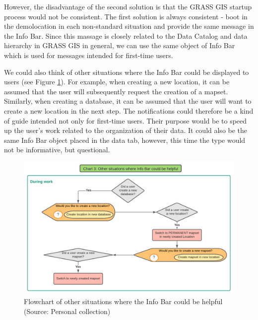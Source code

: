 \documentclass[a4paper,10pt,twoside]{article}
\begin{document}
\noindent However, the disadvantage of the second solution is that the
GRASS GIS startup process would not be consistent. The first solution
is always consistent - boot in the demolocation in each non-standard
situation and provide the same message in the Info Bar. Since this
massage is closely related to the Data Catalog and data hierarchy in
GRASS GIS in general, we can use the same object of Info Bar which is
used for messages intended for first-time users.

We could also think of other situations where the Info Bar could be
displayed to users (see Figure \ref{fig:other_situations}). For
example, when creating a new location, it can be assumed that the user
will subsequently request the creation of a mapset. Similarly, when
creating a database, it can be assumed that the user will want to
create a new location in the next step. The notifications could
therefore be a kind of guide intended not only for first-time
users. Their purpose would be to speed up the user's work related to
the organization of their data. It could also be the same Info Bar
object placed in the data tab, however, this time the type would not
be informative, but questional.

\vspace{0.3cm}
\begin{figure}[hbt!] 
\begin{center}
\includegraphics[width=17cm]{../pictures/other_situations.png} 
\caption[Flowchart of other situations where the Info Bar could be helpful]{Flowchart of other situations where the Info Bar could be helpful (Source: Personal collection)}
\label{fig:other_situations}
\end{center}
\end{figure}
\end{document}
